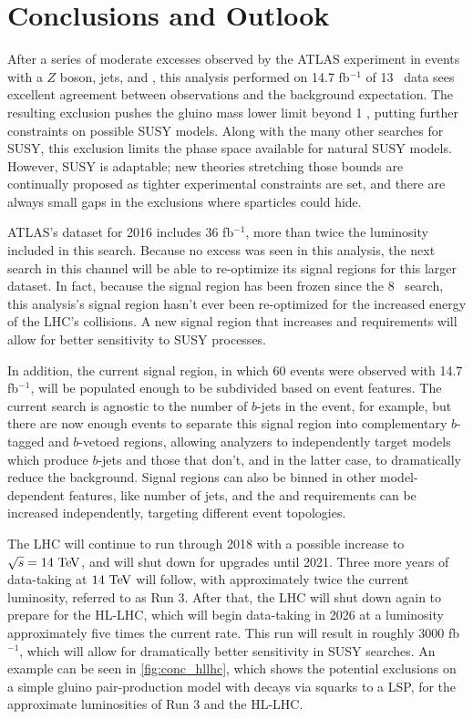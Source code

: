 
\chapter{Conclusions and Outlook} %
\label{ch:conc} 

After a series of moderate excesses observed by the ATLAS experiment in events with a $Z$ boson, jets, and \met, this analysis performed on 14.7 fb$^{-1}$ of 13 \tev~data sees excellent agreement between observations and the background expectation. The resulting exclusion pushes the gluino mass lower limit beyond 1 \tev, putting further constraints on possible \ac{SUSY} models. Along with the many other searches for \ac{SUSY}, this exclusion limits the phase space available for natural \ac{SUSY} models. However, \ac{SUSY} is adaptable; new theories stretching those bounds are continually proposed as tighter experimental constraints are set, and there are always small gaps in the exclusions where sparticles could hide. 

ATLAS's dataset for 2016 includes 36 fb$^{-1}$, more than twice the luminosity included in this search. Because no excess was seen in this analysis, the next search in this channel will be able to re-optimize its signal regions for this larger dataset. In fact, because the signal region has been frozen since the 8 \tev~search, this analysis's signal region hasn't ever been re-optimized for the increased energy of the \ac{LHC}'s collisions. A new signal region that increases \met and \HT requirements will allow for better sensitivity to \ac{SUSY} processes. 

In addition, the current signal region, in which 60 events were observed with 14.7 fb$^{-1}$, will be populated enough to be subdivided based on event features. The current search is agnostic to the number of $b$-jets in the event, for example, but there are now enough events to separate this signal region into complementary $b$-tagged and $b$-vetoed regions, allowing analyzers to independently target models which produce $b$-jets and those that don't, and in the latter case, to dramatically reduce the \ttbar background. Signal regions can also be binned in other model-dependent features, like number of jets, and the \met and \HT requirements can be increased independently, targeting different event topologies. 

The \ac{LHC} will continue to run through 2018 with a possible increase to $\sqrt{s} = 14\tev$, and will shut down for upgrades until 2021. Three more years of data-taking at $14\tev$ will follow, with approximately twice the current luminosity, referred to as Run 3. After that, the \ac{LHC} will shut down again to prepare for the \ac{HL-LHC}, which will begin data-taking in 2026 at a luminosity approximately five times the current rate. This run will result in roughly 3000 fb$^{-1}$, which will allow for dramatically better sensitivity in \ac{SUSY} searches. An example can be seen in \autoref{fig:conc_hllhc}, which shows the potential exclusions on a simple gluino pair-production model with decays via squarks to a \ac{LSP}, for the approximate luminosities of Run 3 and the \ac{HL-LHC}. 

